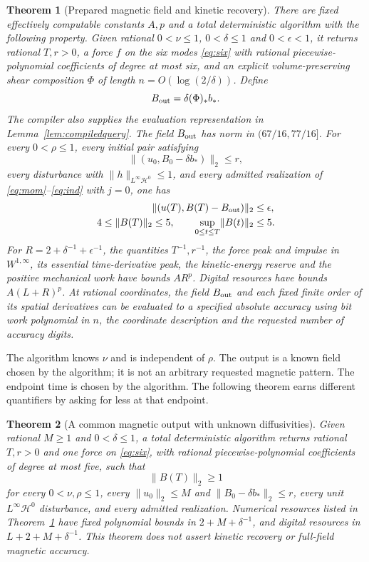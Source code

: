 \documentclass[11pt,a4paper]{amsart}
\newtheorem{theorem}{Theorem}[section]
\theoremstyle{definition}
\theoremstyle{remark}
\numberwithin{equation}{section}
\newcommand{\Hcal}{\mathcal H}
\newcommand{\norm}[1]{\lVert #1\rVert}
\newcommand{\push}[1]{(#1)_*}
\begin{document}
\begin{theorem}[Prepared magnetic field and kinetic recovery]\label{thm:main}
There are fixed effectively computable constants $A,p$ and a total deterministic algorithm with the following property. Given rational $0<\nu\le1$, $0<\delta\le1$ and $0<\epsilon<1$, it returns rational $T,r>0$, a force $f$ on the six modes \eqref{eq:six} with rational piecewise-polynomial coefficients of degree at most six, and an explicit volume-preserving shear composition $\Phi$ of length $n=O(\log(2/\delta))$. Define
\[
 B_{\rm out}=\delta\push\Phi b_*.
\]
The compiler also supplies the evaluation representation in Lemma~\ref{lem:compiledquery}. The field $B_{\rm out}$ has norm in $(67/16,77/16]$. For every $0<\rho\le1$, every initial pair satisfying
\begin{equation}\label{eq:prepball}
 \norm{(u_0,B_0-\delta b_*)}_2\le r,
\end{equation}
every disturbance with $\norm h_{L^\infty\Hcal^0}\le1$, and every admitted realization of \eqref{eq:mom}--\eqref{eq:ind} with $j=0$, one has
\begin{align}
 \norm{(u(T),B(T)-B_{\rm out})}_2&\le\epsilon,\label{eq:mainout}\\
 4\le\norm{B(T)}_2\le5,\qquad
 \sup_{0\le t\le T}\norm{B(t)}_2&\le5.\label{eq:mainnorm}
\end{align}
For $R=2+\delta^{-1}+\epsilon^{-1}$, the quantities $T^{-1},r^{-1}$, the force peak and impulse in $W^{1,\infty}$, its essential time-derivative peak, the kinetic-energy reserve and the positive mechanical work have bounds $AR^p$. Digital resources have bounds $A(L+R)^p$. At rational coordinates, the field $B_{\rm out}$ and each fixed finite order of its spatial derivatives can be evaluated to a specified absolute accuracy using bit work polynomial in $n$, the coordinate description and the requested number of accuracy digits.
\end{theorem}

The algorithm knows $\nu$ and is independent of $\rho$. The output is a known field chosen by the algorithm; it is not an arbitrary requested magnetic pattern. The endpoint time is chosen by the algorithm. The following theorem earns different quantifiers by asking for less at that endpoint.

\begin{theorem}[A common magnetic output with unknown diffusivities]\label{thm:unknown}
Given rational $M\ge1$ and $0<\delta\le1$, a total deterministic algorithm returns rational $T,r>0$ and one force on \eqref{eq:six}, with rational piecewise-polynomial coefficients of degree at most five, such that
\begin{equation}\label{eq:unknownout}
 \norm{B(T)}_2\ge1
\end{equation}
for every $0<\nu,\rho\le1$, every $\norm{u_0}_2\le M$ and $\norm{B_0-\delta b_*}_2\le r$, every unit $L^\infty\Hcal^0$ disturbance, and every admitted realization. Numerical resources listed in Theorem~\ref{thm:main} have fixed polynomial bounds in $2+M+\delta^{-1}$, and digital resources in $L+2+M+\delta^{-1}$. This theorem does not assert kinetic recovery or full-field magnetic accuracy.
\end{theorem}
\end{document}
